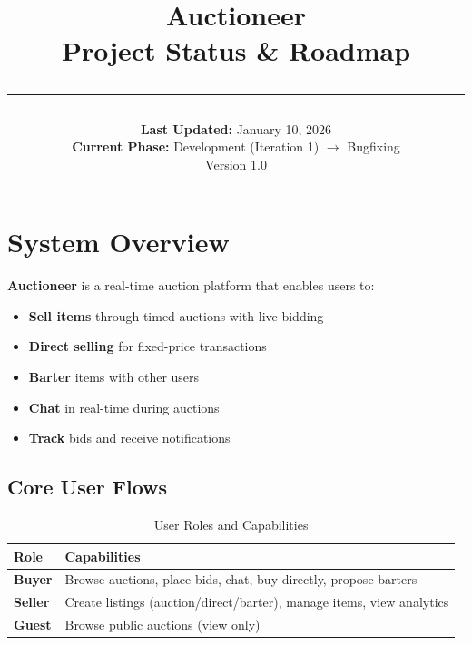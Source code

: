 \documentclass[12pt,a4paper]{article}
\title{
    \vspace{-2cm}
    {\Huge\textbf{\textcolor{primary}{Auctioneer}}}\\[0.3cm]
    {\Large Project Status \& Roadmap}\\[0.5cm]
    \rule{\textwidth}{0.4pt}
}
\author{}
\date{
    \textbf{Last Updated:} January 10, 2026\\
    \textbf{Current Phase:} Development (Iteration 1) $\rightarrow$ Bugfixing\\[0.5cm]
    Version 1.0
}
\begin{document}
\maketitle
\thispagestyle{empty}

\vfill
\begin{center}
\end{center}
\vfill

\newpage

\tableofcontents
\newpage

\section{System Overview}

\textbf{Auctioneer} is a real-time auction platform that enables users to:

\begin{itemize}
    \item \textbf{Sell items} through timed auctions with live bidding
    \item \textbf{Direct selling} for fixed-price transactions
    \item \textbf{Barter} items with other users
    \item \textbf{Chat} in real-time during auctions
    \item \textbf{Track} bids and receive notifications
\end{itemize}

\subsection{Core User Flows}

\begin{table}[H]
\centering
\begin{tabularx}{\textwidth}{|l|X|}
\hline
\textbf{Role} & \textbf{Capabilities} \\
\hline
\textbf{Buyer} & Browse auctions, place bids, chat, buy directly, propose barters \\
\hline
\textbf{Seller} & Create listings (auction/direct/barter), manage items, view analytics \\
\hline
\textbf{Guest} & Browse public auctions (view only) \\
\hline
\end{tabularx}
\caption{User Roles and Capabilities}
\end{table}
\end{document}
